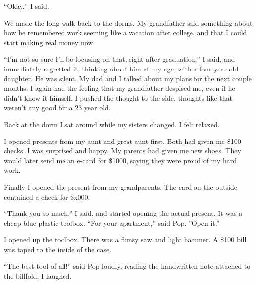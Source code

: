 ``Okay,'' I said.  

We made the long walk back to the dorms.  My grandfather said something about
how he remembered work seeming like a vacation after college, and that I could
start making real money now.

``I'm not so sure I'll be focusing on that, right after graduation,'' I said,
and immediately regretted it, thinking about him at my age, with a four year old
daughter.  He was silent.  My dad and I talked about my plans for the next
couple months.  I again had the feeling that my grandfather despised me, even if
he didn't know it himself.  I pushed the thought to the side, thoughts like that
weren't any good for a 23 year old.

Back at the dorm I sat around while my sisters changed.  I felt relaxed.

I opened presents from my aunt and great aunt first.  Both had given me \$100
checks.  I was surprised and happy.  My parents had given me new shoes.  They
would later send me an e-card for \$1000, saying they were proud of my hard
work.  

Finally I opened the present from my grandparents.  The card on the outside
contained a check for \$x000.  

``Thank you so much,'' I said, and started opening the actual present.  It was a
cheap blue plastic toolbox.  ``For your apartment,'' said Pop.  ''Open it.''

I opened up the toolbox.  There was a flimsy saw and light hammer.  A \$100 bill
was taped to the inside of the case.

``The best tool of all!'' said Pop loudly, reading the handwritten note attached
to the billfold.  I laughed.

